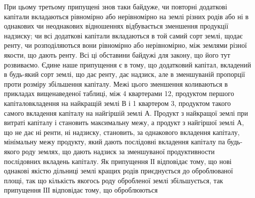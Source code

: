 \noindent{}При цьому третьому припущені знов таки байдуже, чи повторні додаткові
капітали вкладаються рівномірно або нерівномірно на землі різних родів або ні
в однакових чи неоднакових відношеннях відбувається зменшення продукції
надзиску; чи всі додаткові капітали вкладаються в той самий сорт землі, щодає
ренту, чи розподіляються вони рівномірно або нерівномірно, між землями
різної якости, що дають ренту. Всі ці обставини байдужі для закону, що його тут
розвиваємо. Єдине наше припущення є в тому, що додатковий капітал,
вкладений в будь-який сорт землі, що дає ренту, дає надзиск, але в зменшуваній
пропорції проти розміру збільшення капіталу. Межі цього зменшення
коливаються в прикладах вищенаведеної таблиці, між 4 квартерами \deq{} 12,
продуктом першого капіталовкладення на найкращій землі $В$ і 1 квартером
\deq{} 3, продуктом такого самого вкладення капіталу на найгіршій
землі $А$. Продукт з найкращої землі при витраті капіталу і становить максимальну
межу, а продукт з найгіршої землі $А$, що не дає ні ренти, ні надзиску,
становить, за однакового вкладення капіталу, мінімальну межу продукту,
який дають послідовні вкладення капіталу па будь-якого роду землях, що дають надзиск за зменшуваної
продуктивности послідовних вкладень капіталу. Як
припущення ІІ відповідає тому, що нові однакові якістю дільниці землі кращих
родів приєднується до оброблюваної площі, так що кількість якогось роду обробленої
землі збільшується, так припущення ІІІ відповідає тому, що оброблюються
\parbreak{}  %
